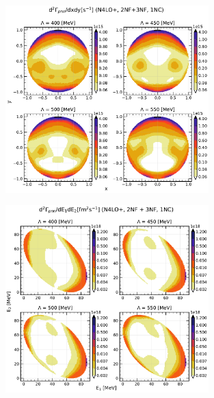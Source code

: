     \begin{figure}[h]
        \begin{center}
        \includegraphics[width=0.7\textwidth]{PlotData/PION/Dalitz_maps/figures/Dalitz_map_pnn_xy_cutofs_1NC.pdf}
        \end{center}
        \caption{}
        \label{pion_map_xy_cutoff_1NC}
    \end{figure}

    \begin{figure}[h]
        \begin{center}
        \includegraphics[width=0.7\textwidth]{PlotData/PION/Dalitz_maps/figures/Dalitz_map_pnn_E1E2_cutofs_1NC.pdf}
        \end{center}
        \caption{}
        \label{pion_map_E1E2_cutoff_1NC}
    \end{figure}

